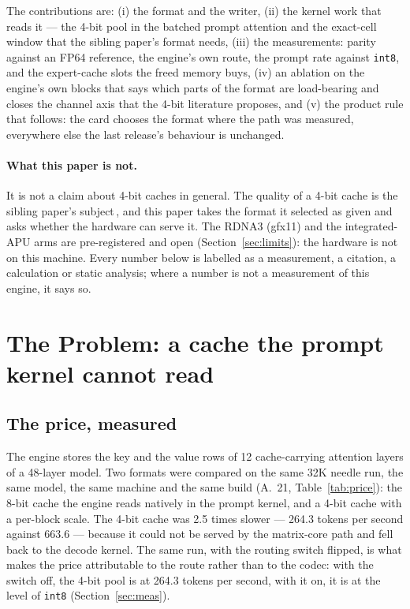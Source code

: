 \documentclass[10pt,twocolumn]{article}
\begin{document}
The contributions are: (i) the format and the writer, (ii) the kernel work that reads it --- the 4-bit
pool in the batched prompt attention and the exact-cell window that the sibling paper's format needs,
(iii) the measurements: parity against an FP64 reference, the engine's own route, the prompt rate against
\texttt{int8}, and the expert-cache slots the freed memory buys, (iv) an ablation on the engine's own blocks
that says which parts of the format are load-bearing and closes the channel axis that the 4-bit literature
proposes, and (v) the product rule that follows: the card chooses the format where the path was measured,
everywhere else the last release's behaviour is unchanged.

\paragraph{What this paper is not.} It is not a claim about 4-bit caches in general. The quality of a 4-bit
cache is the sibling paper's subject\,\cite{shear}, and this paper takes the format it selected as given
and asks whether the hardware can serve it. The RDNA3 (gfx11) and the integrated-APU arms are
pre-registered and open (Section~\ref{sec:limits}): the hardware is not on this machine. Every number below
is labelled as a measurement, a citation, a calculation or static analysis; where a number is not a
measurement of this engine, it says so.

\section{The Problem: a cache the prompt kernel cannot read}
\label{sec:problem}

\subsection{The price, measured}

The engine stores the key and the value rows of 12 cache-carrying attention layers of a 48-layer model. Two
formats were compared on the same 32K needle run, the same model, the same machine and the same build
(A.~21, Table~\ref{tab:price}): the 8-bit cache the engine reads natively in the prompt kernel, and a
4-bit cache with a per-block scale. The 4-bit cache was 2.5 times slower --- 264.3 tokens per second
against 663.6 --- because it could not be served by the matrix-core path and fell back to the decode kernel.
The same run, with the routing switch flipped, is what makes the price attributable to the route rather
than to the codec: with the switch off, the 4-bit pool is at 264.3 tokens per second, with it on, it is at
the level of \texttt{int8} (Section~\ref{sec:meas}).
\end{document}
